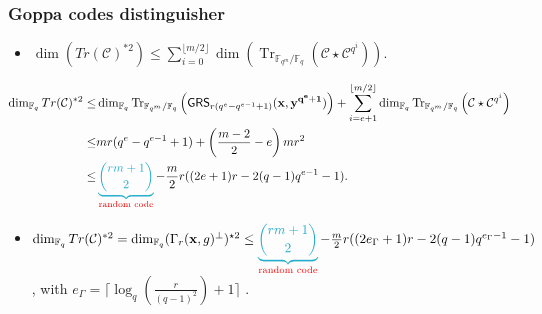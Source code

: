 \documentclass[
10pt, %
%
aspectratio=169, %
]{beamer}
\theoremstyle{plain}%
\theoremstyle{definition}
\theoremstyle{remark}
\newcommand{\calC}{\mathcal{C}}
\newcommand{\fqm}{\mathbb{F}_{q^m}}
\newcommand{\fq}{\mathbb{F}_{q}}
\newcommand{\Tr}[1]{\operatorname{Tr}_{\mathbb{F}_{q^m}/\fq}\left(#1\right)}
\newcommand{\GRS}{\operatorname{\mathsf{GRS}}}
\begin{document}
\begin{frame}
	\frametitle{Goppa codes distinguisher \cite{MT21}}
	\begin{itemize}
		\item $\dim\left( Tr(\calC)^{*2}\right) \leq \sum\limits_{i=0}^{\lfloor{m/2} \rfloor} \dim \left( \Tr{\calC\star \calC^{q^i}}\right).$
	\end{itemize}
	\vspace{-0.9em}
\begin{align*}
	\dim_{\fq}Tr(\calC)^{*2}\leq& \dim_{\fq}\Tr{\GRS_{r(q^e -q^{e-1}+1)}(\mathbf{x},\mathbf{y^{q^e+1}})}+ \sum\limits_{i=e+1}^{\lfloor{m/2} \rfloor} \dim_{\fq}\Tr{\calC\star \calC^{q^i}}\\
	\leq& mr(q^e -q^{e-1}+1) + \left( \frac{m-2}{2}-e\right) mr^2\\
	\leq& \mathcolor{ballblue}{\underbrace{\binom{rm+1}{2}}}_{\text{\textcolor{red}{random code}}}  - \frac{m}{2}r((2e+1)r - 2(q-1)q^{e-1}-1).
\end{align*}
\vspace{-0.5em}
\begin{itemize}
	\item $\dim_{\fq}Tr(\calC)^{*2} = \dim_{\fq}(\Gamma_r(\mathbf{x},g)^{\perp})^{\star 2}\leq \mathcolor{ballblue}{\underbrace{\binom{rm+1}{2}}}_{\text{\textcolor{red}{random code}}}  - \frac{m}{2}r((2e_{\Gamma}+1)r - 2(q-1)q^{e_{\Gamma}-1}-1)$,\vspace{-0.7em}
	with $e_{\Gamma}= \lceil\log_q(\frac{r}{(q - 1)^2})+1\rceil$ \cite{MT21}.
\end{itemize}
\end{frame}
\end{document}
